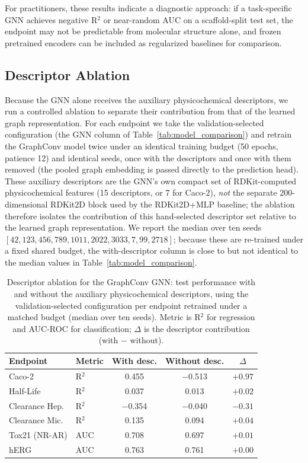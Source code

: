 \documentclass[journal]{IEEEtran}
\begin{document}
For practitioners, these results indicate a diagnostic approach: if a task-specific GNN achieves negative R$^2$ or near-random AUC on a scaffold-split test set, the endpoint may not be predictable from molecular structure alone, and frozen pretrained encoders can be included as regularized baselines for comparison.

\subsection{Descriptor Ablation}
\label{sec:descriptor_ablation}

Because the GNN alone receives the auxiliary physicochemical descriptors, we run a controlled ablation to separate their contribution from that of the learned graph representation. For each endpoint we take the validation-selected configuration (the GNN column of Table~\ref{tab:model_comparison}) and retrain the GraphConv model twice under an identical training budget (50 epochs, patience 12) and identical seeds, once with the descriptors and once with them removed (the pooled graph embedding is passed directly to the prediction head). These auxiliary descriptors are the GNN's own compact set of RDKit-computed physicochemical features (15 descriptors, or 7 for Caco-2), \emph{not} the separate 200-dimensional RDKit2D block used by the RDKit2D+MLP baseline; the ablation therefore isolates the contribution of this hand-selected descriptor set relative to the learned graph representation. We report the median over ten seeds $[42, 123, 456, 789, 1011, 2022, 3033, 7, 99, 2718]$; because these are re-trained under a fixed shared budget, the with-descriptor column is close to but not identical to the median values in Table~\ref{tab:model_comparison}.

\begin{table}[!t]
\centering
\caption{Descriptor ablation for the GraphConv GNN: test performance with and without the auxiliary physicochemical descriptors, using the validation-selected configuration per endpoint retrained under a matched budget (median over ten seeds). Metric is R$^2$ for regression and AUC-ROC for classification; $\Delta$ is the descriptor contribution (with $-$ without).}
\label{tab:descriptor_ablation}
\small
\setlength{\tabcolsep}{4pt}
\begin{tabular}{llccc}
\toprule
\textbf{Endpoint} & \textbf{Metric} & \textbf{With desc.} & \textbf{Without desc.} & \textbf{$\Delta$} \\
\midrule
Caco-2 & R$^2$ & 0.455 & $-$0.513 & $+0.97$ \\
Half-Life & R$^2$ & 0.037 & 0.013 & $+0.02$ \\
Clearance Hep. & R$^2$ & $-$0.354 & $-$0.040 & $-0.31$ \\
Clearance Mic. & R$^2$ & 0.135 & 0.094 & $+0.04$ \\
Tox21 (NR-AR) & AUC & 0.708 & 0.697 & $+0.01$ \\
hERG & AUC & 0.763 & 0.761 & $+0.00$ \\
\bottomrule
\end{tabular}
\end{table}
\end{document}
